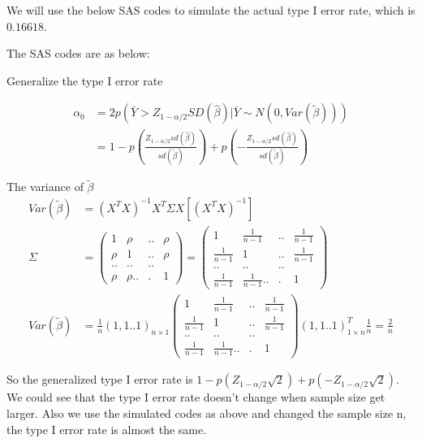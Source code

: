 \documentclass[11pt]{article} %
\begin{document}
\begin{itemize}
We will use the below SAS codes to simulate the actual type I error rate, which is $ 0.16618$. 

The SAS codes are as below:


Generalize the type I error rate 

\begin{align*}
	\alpha_0 &= 2p( \bar{Y} > Z_{1-\alpha/2} SD(\hat{\beta}) | \bar{Y} \sim N(0, Var(\tilde{\beta}))) \\
	&= 1 - p(\frac{Z_{1-\alpha/2} sd(\hat{\beta})}{sd(\tilde{\beta})}) + p(- \frac{Z_{1-\alpha/2} sd(\hat{\beta})}{sd(\tilde{\beta})})
\end{align*}

The variance of $\tilde{\beta}$
\begin{align*}
	Var(\tilde{\beta} ) &= (X^T X)^{-1}X^T \Sigma X [(X^T X)^{-1}]  \\
	\Sigma &= \begin{pmatrix}
		1 & \rho &.. & \rho \\
		\rho & 1 &.. & \rho\\
		.. &.. & ..& \\
		\rho & \rho ..&. & 1 
	\end{pmatrix} = \begin{pmatrix}
		1 & \frac{1}{n-1} &.. & \frac{1}{n-1} \\
		\frac{1}{n-1}  & 1 &.. & \frac{1}{n-1} \\
		.. &.. & ..& \\
		\frac{1}{n-1}  & \frac{1}{n-1}  ..&. & 1 
	\end{pmatrix} \\
	Var(\tilde{\beta} ) &= \frac{1}{n} (1,1..1)_{n \times 1} \begin{pmatrix}
		1 & \frac{1}{n-1} &.. & \frac{1}{n-1} \\
		\frac{1}{n-1}  & 1 &.. & \frac{1}{n-1} \\
		.. &.. & ..& \\
		\frac{1}{n-1}  & \frac{1}{n-1}  ..&. & 1 
	\end{pmatrix}  (1,1..1)^T_{1 \times n} \frac{1}{n}  = \frac{2}{n}
\end{align*}

So the generalized type I error rate is $1 - p(Z_{1-\alpha/2} \sqrt{2}) + p(- Z_{1-\alpha/2} \sqrt{2})$. We could see that the type I error rate doesn't change when sample size get larger.
Also we use the simulated codes as above and changed the sample size n, the type I error rate is almost the same. 
 

\end{itemize}
\end{document}
